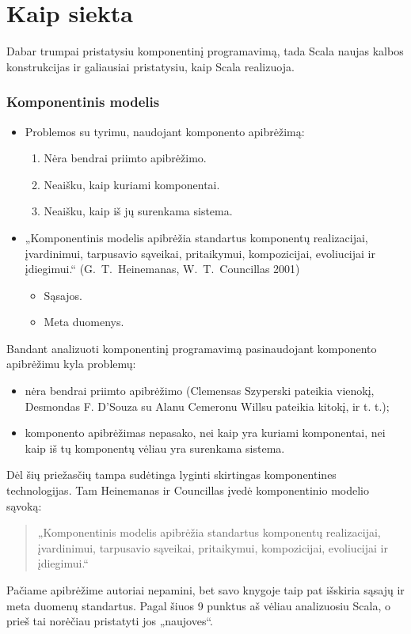 \section{Kaip siekta}

\begin{handout}
  Dabar trumpai pristatysiu komponentinį programavimą, tada Scala
  naujas kalbos konstrukcijas ir galiausiai pristatysiu, kaip
  Scala realizuoja.
\end{handout}

\begin{frame}
  \frametitle{Komponentinis modelis}
  \begin{itemize}
    \item Problemos su tyrimu, naudojant komponento apibrėžimą:
      \begin{enumerate}
        \item Nėra bendrai priimto apibrėžimo.
        \item Neaišku, kaip kuriami komponentai.
        \item Neaišku, kaip iš jų surenkama sistema.
      \end{enumerate}
    \item „Komponentinis modelis apibrėžia standartus komponentų
      realizacijai, įvardinimui, tarpusavio sąveikai, pritaikymui,
      kompozicijai, evoliucijai ir įdiegimui.“ (\mbox{G. T. Heinemanas},
      \mbox{W. T. Councillas} 2001)
      \begin{itemize}
        \item Sąsajos.
        \item Meta duomenys.
      \end{itemize}
  \end{itemize}
  \begin{handout}
    Bandant analizuoti komponentinį programavimą pasinaudojant komponento
    apibrėžimu kyla problemų:
    \begin{itemize}
      \item nėra bendrai priimto apibrėžimo (Clemensas Szyperski
        pateikia vienokį, Desmondas F. D'Souza su Alanu Cemeronu
        Willsu pateikia kitokį, ir t. t.);
      \item komponento apibrėžimas nepasako, nei kaip yra kuriami
        komponentai, nei kaip iš tų komponentų vėliau yra surenkama
        sistema.
    \end{itemize}
    Dėl šių priežasčių tampa sudėtinga lyginti skirtingas
    komponentines technologijas. Tam Heinemanas ir Councillas įvedė
    komponentinio modelio sąvoką:
    \begin{quote}
      „Komponentinis modelis apibrėžia standartus komponentų
      realizacijai, įvardinimui, tarpusavio sąveikai, pritaikymui,
      kompozicijai, evoliucijai ir įdiegimui.“
    \end{quote}
    Pačiame apibrėžime autoriai nepamini, bet savo knygoje taip pat
    išskiria sąsajų ir meta duomenų standartus. Pagal šiuos 9
    punktus aš vėliau analizuosiu Scala, o prieš tai norėčiau
    pristatyti jos „naujoves“.


\end{handout}
\end{frame}
